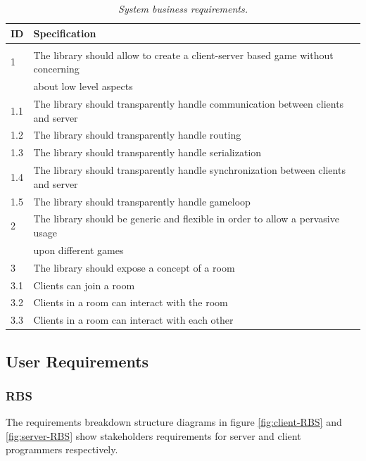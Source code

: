 \begin{center}
  \begin{longtable}{|l|l|} 
  \caption{\textit{System business requirements.}} \label{table:buss-req} \\
   
\hline
ID   &  Specification \\
\hline
\multicolumn{2}{|c|}{} \\
\hline
1   & The library should allow to create a client-server based game without concerning \\ 
    & about low level aspects \\
1.1 & The library should transparently handle communication between clients and server \\
1.2 & The library should transparently handle routing \\
1.3 & The library should transparently handle serialization \\
1.4 & The library should transparently handle synchronization between clients and server \\
1.5 & The library should transparently handle gameloop \\
2   & The library should be generic and flexible in order to allow a pervasive usage \\
    & upon different games \\    
3   & The library should expose a concept of a room \\
3.1 & Clients can join a room \\
3.2 & Clients in a room can interact with the room \\
3.3 & Clients in a room can interact with each other \\
\hline

  \end{longtable}
\end{center}

\subsection{User Requirements}

\subsubsection{RBS}

The requirements breakdown structure diagrams in figure \ref{fig:client-RBS} and \ref{fig:server-RBS} show stakeholders requirements for server and client programmers respectively.  

